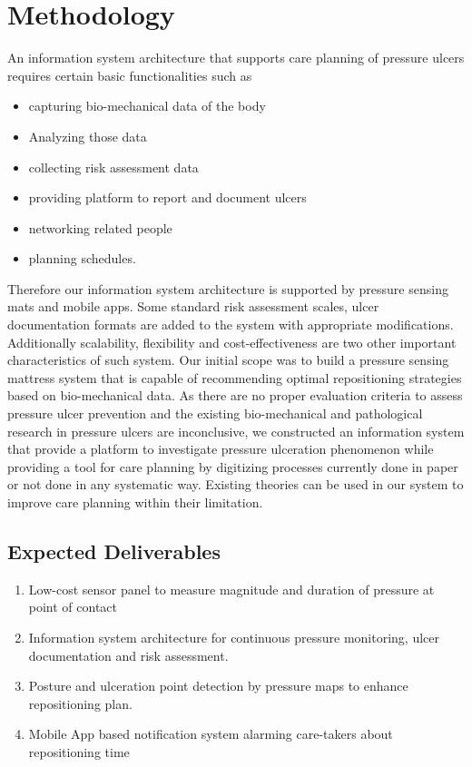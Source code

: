 \chapter{Methodology}
\label{chapter:method}

An information system architecture that supports care planning of pressure ulcers requires certain basic functionalities such as 
\begin{itemize}
	\item capturing bio-mechanical data of the body
	\item Analyzing those data
	\item collecting risk assessment data
	\item providing platform to report and document ulcers
	\item networking related people
	\item planning schedules.
\end{itemize}

Therefore our information system architecture is supported by pressure sensing mats and mobile apps. Some standard risk assessment scales, ulcer documentation formats are added to the system with appropriate modifications. Additionally scalability, flexibility and cost-effectiveness are two other important characteristics of such system. Our initial scope was to build a pressure sensing mattress system that is capable of recommending optimal repositioning strategies based on bio-mechanical data. As there are no proper evaluation criteria to assess pressure ulcer  prevention and the existing bio-mechanical and pathological research in pressure ulcers are inconclusive, we constructed an information system that provide a platform to investigate pressure ulceration phenomenon while providing a tool for care planning by digitizing processes currently done in paper or not done in any systematic way. Existing theories can be used in our system to improve care planning within their limitation.

\section{Expected Deliverables}
\begin{enumerate}
	\item Low-cost sensor panel to measure magnitude and duration of pressure at point of contact
	\item Information system architecture for continuous pressure monitoring, ulcer documentation and risk assessment.
	\item Posture and ulceration point detection by pressure maps to enhance repositioning plan.
	\item Mobile App based notification system alarming care-takers about repositioning time
\end{enumerate}

